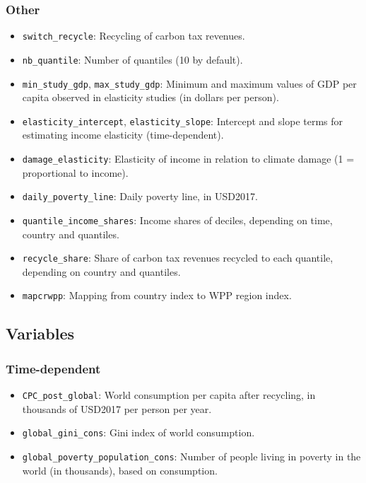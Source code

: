 \documentclass[
]{article}
\providecommand{\tightlist}{%
  \setlength{\itemsep}{0pt}\setlength{\parskip}{0pt}}
\begin{document}
\subsubsection{Other}\label{other}

\begin{itemize}
\tightlist
\item
  \texttt{switch\_recycle}: Recycling of carbon tax revenues.
\item
  \texttt{nb\_quantile}: Number of quantiles (10 by default).
\item
  \texttt{min\_study\_gdp}, \texttt{max\_study\_gdp}: Minimum and
  maximum values of GDP per capita observed in elasticity studies (in
  dollars per person).
\item
  \texttt{elasticity\_intercept}, \texttt{elasticity\_slope}: Intercept
  and slope terms for estimating income elasticity (time-dependent).
\item
  \texttt{damage\_elasticity}: Elasticity of income in relation to
  climate damage (1 = proportional to income).
\item
  \texttt{daily\_poverty\_line}: Daily poverty line, in USD2017.
\item
  \texttt{quantile\_income\_shares}: Income shares of deciles, depending
  on time, country and quantiles.
\item
  \texttt{recycle\_share}: Share of carbon tax revenues recycled to each
  quantile, depending on country and quantiles.
\item
  \texttt{mapcrwpp}: Mapping from country index to WPP region index.
\end{itemize}

\subsection{Variables}\label{variables-6}

\subsubsection{Time-dependent}\label{time-dependent-5}

\begin{itemize}
\tightlist
\item
  \texttt{CPC\_post\_global}: World consumption per capita after
  recycling, in thousands of USD2017 per person per year.
\item
  \texttt{global\_gini\_cons}: Gini index of world consumption.
\item
  \texttt{global\_poverty\_population\_cons}: Number of people living in
  poverty in the world (in thousands), based on consumption.
\end{itemize}
\end{document}

